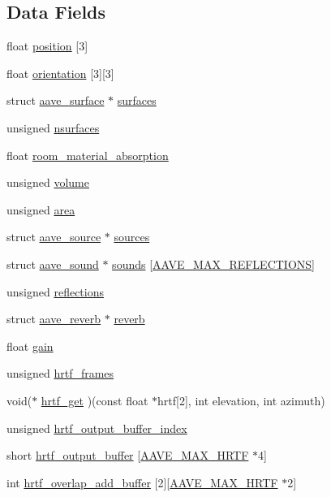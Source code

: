 \subsection*{Data Fields}
\begin{DoxyCompactItemize}
\item 
float \hyperlink{structaave_aa592d293dfb41b86d48c0529fd3549d6}{position} \mbox{[}3\mbox{]}
\item 
float \hyperlink{structaave_a1380ca0c5d7610cf1b409043b93b2680}{orientation} \mbox{[}3\mbox{]}\mbox{[}3\mbox{]}
\item 
struct \hyperlink{structaave__surface}{aave\-\_\-surface} $\ast$ \hyperlink{structaave_ad7a69df05d26827f132c742551fb8871}{surfaces}
\item 
unsigned \hyperlink{structaave_a46897bdef9912d50cecb6b93c8c894a6}{nsurfaces}
\item 
float \hyperlink{structaave_afe632929215cd44b7344bb4380df1c69}{room\-\_\-material\-\_\-absorption}
\item 
unsigned \hyperlink{structaave_a6d16180d7cb50c0255180a0102abfc2e}{volume}
\item 
unsigned \hyperlink{structaave_ad7a37d4250667623a1cd209b5aa421dd}{area}
\item 
struct \hyperlink{structaave__source}{aave\-\_\-source} $\ast$ \hyperlink{structaave_ad6f8dfdcb3403e1cf8e8b42c16851317}{sources}
\item 
struct \hyperlink{structaave__sound}{aave\-\_\-sound} $\ast$ \hyperlink{structaave_aa637fd7286c95ab8322e391f461e825d}{sounds} \mbox{[}\hyperlink{aave_8h_a5cc7807cca10cf0933038ad388171181}{A\-A\-V\-E\-\_\-\-M\-A\-X\-\_\-\-R\-E\-F\-L\-E\-C\-T\-I\-O\-N\-S}\mbox{]}
\item 
unsigned \hyperlink{structaave_a89d048be9cbd805d11b23d0c8d118eb8}{reflections}
\item 
struct \hyperlink{structaave__reverb}{aave\-\_\-reverb} $\ast$ \hyperlink{structaave_ad2e95c7026a1361aebbd89107903c4be}{reverb}
\item 
float \hyperlink{structaave_a8cb46909713b403fa7f54b75dee1e81f}{gain}
\item 
unsigned \hyperlink{structaave_a41b7518a03a90f29e627adf308e68200}{hrtf\-\_\-frames}
\item 
void($\ast$ \hyperlink{structaave_a5ab930083fffbd9efe3bffe51dae585b}{hrtf\-\_\-get} )(const float $\ast$hrtf\mbox{[}2\mbox{]}, int elevation, int azimuth)
\item 
unsigned \hyperlink{structaave_a50881090e68ae1bde54b091757b99d64}{hrtf\-\_\-output\-\_\-buffer\-\_\-index}
\item 
short \hyperlink{structaave_a4aabeeaaa2fd6eecaa74cf9ff6a4a75c}{hrtf\-\_\-output\-\_\-buffer} \mbox{[}\hyperlink{aave_8h_a19ea3a18eb313fc3b825f522245d19d3}{A\-A\-V\-E\-\_\-\-M\-A\-X\-\_\-\-H\-R\-T\-F} $\ast$4\mbox{]}
\item 
int \hyperlink{structaave_a591c8877020f861da25632f35f67c3b4}{hrtf\-\_\-overlap\-\_\-add\-\_\-buffer} \mbox{[}2\mbox{]}\mbox{[}\hyperlink{aave_8h_a19ea3a18eb313fc3b825f522245d19d3}{A\-A\-V\-E\-\_\-\-M\-A\-X\-\_\-\-H\-R\-T\-F} $\ast$2\mbox{]}
\end{DoxyCompactItemize}


